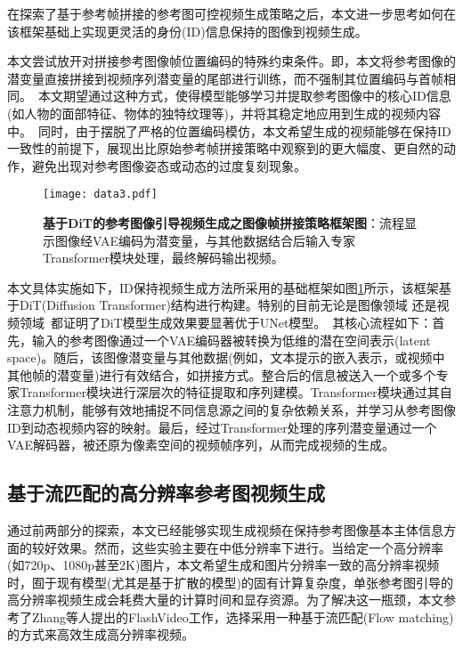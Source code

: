 在探索了基于参考帧拼接的参考图可控视频生成策略之后，本文进一步思考如何在该框架基础上实现更灵活的身份(ID)信息保持的图像到视频生成。

本文尝试放开对拼接参考图像帧位置编码的特殊约束条件。即，本文将参考图像的潜变量直接拼接到视频序列潜变量的尾部进行训练，而不强制其位置编码与首帧相同。\
本文期望通过这种方式，使得模型能够学习并提取参考图像中的核心ID信息(如人物的面部特征、物体的独特纹理等)，并将其稳定地应用到生成的视频内容中。\
同时，由于摆脱了严格的位置编码模仿，本文希望生成的视频能够在保持ID一致性的前提下，展现出比原始参考帧拼接策略中观察到的更大幅度、更自然的动作，避免出现对参考图像姿态或动态的过度复刻现象。
\begin{figure}[H]
    \centering
    \texttt{[image: data3.pdf]}
    \caption{\textbf{基于DiT的参考图像引导视频生成之图像帧拼接策略框架图}：流程显示图像经VAE编码为潜变量，与其他数据结合后输入专家Transformer模块处理，最终解码输出视频。}
    \label{architecture1}
\end{figure}
本文具体实施如下，ID保持视频生成方法所采用的基础框架如图\ref{architecture1}所示，该框架基于DiT(Diffusion Transformer)结构进行构建。特别的目前无论是图像领域\cite{peebles2023scalable,chen2023pixart} 还是视频领域~\cite{hong2022cogvideo, yang2024cogvideox, kong2024hunyuanvideo, lin2024open}都证明了DiT模型生成效果要显著优于UNet模型。\
其核心流程如下：首先，输入的参考图像通过一个VAE编码器被转换为低维的潜在空间表示(latent space)。随后，该图像潜变量与其他数据(例如，文本提示的嵌入表示，或视频中其他帧的潜变量)进行有效结合，如拼接方式。整合后的信息被送入一个或多个专家Transformer模块进行深层次的特征提取和序列建模。Transformer模块通过其自注意力机制，能够有效地捕捉不同信息源之间的复杂依赖关系，并学习从参考图像ID到动态视频内容的映射。最后，经过Transformer处理的序列潜变量通过一个VAE解码器，被还原为像素空间的视频帧序列，从而完成视频的生成。


\subsection{基于流匹配的高分辨率参考图视频生成}
通过前两部分的探索，本文已经能够实现生成视频在保持参考图像基本主体信息方面的较好效果。然而，这些实验主要在中低分辨率下进行。当给定一个高分辨率(如720p、1080p甚至2K)图片，本文希望生成和图片分辨率一致的高分辨率视频时，囿于现有模型(尤其是基于扩散的模型)的固有计算复杂度，单张参考图引导的高分辨率视频生成会耗费大量的计算时间和显存资源。为了解决这一瓶颈，本文参考了Zhang等人提出的FlashVideo\cite{zhang2025flashvideo}工作，选择采用一种基于流匹配(Flow matching)的方式来高效生成高分辨率视频。

